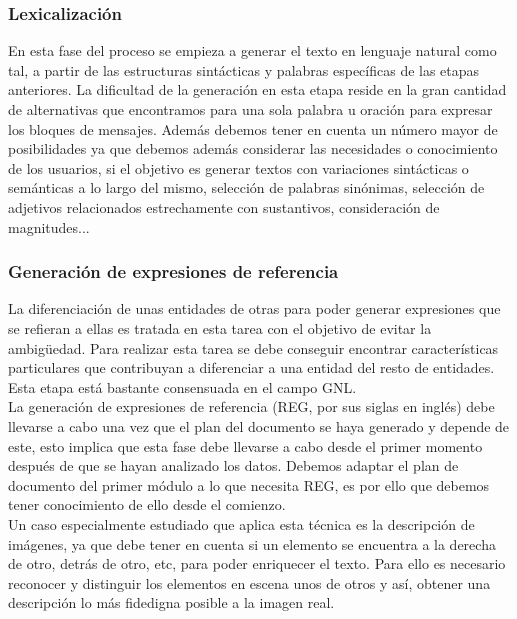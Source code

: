 \subsubsection{Lexicalización}
En esta fase del proceso se empieza a generar el texto en lenguaje natural como tal, a partir de las estructuras sintácticas y palabras específicas de las etapas anteriores. La dificultad de la generación en esta etapa reside en la gran cantidad de alternativas que encontramos para una sola palabra u oración para expresar los bloques de mensajes. Además debemos tener en cuenta un número mayor de posibilidades ya que debemos además considerar las necesidades o conocimiento de los usuarios, si el objetivo es generar textos con variaciones sintácticas o semánticas a lo largo del mismo, selección de palabras sinónimas, selección de adjetivos relacionados estrechamente con sustantivos, consideración de magnitudes... \\


\subsubsection{Generación de expresiones de referencia}
La diferenciación de unas entidades de otras para poder generar expresiones que se refieran a ellas es tratada en esta tarea con el objetivo de evitar la ambigüedad. Para realizar esta tarea se debe conseguir encontrar características particulares que contribuyan a diferenciar a una entidad del resto de entidades. Esta etapa está bastante consensuada en el campo GNL.\\ 

La generación de expresiones de referencia (REG, por sus siglas en inglés) debe llevarse a cabo una vez que el plan del documento se haya generado y depende de este, esto implica que esta fase debe llevarse a cabo desde el primer momento después de que se hayan analizado los datos. Debemos adaptar el plan de documento del primer módulo a lo que necesita REG, es por ello que debemos tener conocimiento de ello desde el comienzo.\\

Un caso especialmente estudiado que aplica esta técnica es la descripción de imágenes, ya que debe tener en cuenta si un elemento se encuentra a la derecha de otro, detrás de otro, etc, para poder enriquecer el texto. Para ello es necesario reconocer y distinguir los elementos en escena unos de otros y así, obtener una descripción lo más fidedigna posible a la imagen real.\\

